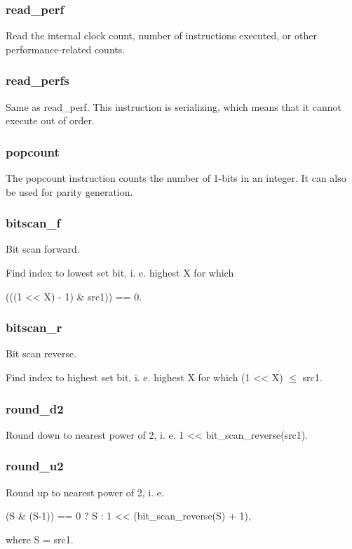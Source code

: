 \documentclass[forwardcom.tex]{subfiles}
\begin{document}
\subsubsection{read\_perf}
Read the internal clock count, number of instructions executed, or other performance-related counts.

\subsubsection{read\_perfs}
Same as read\_perf. This instruction is serializing, which means that it cannot execute out of order.

\subsubsection{popcount}
The popcount instruction counts the number of 1-bits in an integer. It can also be used for parity generation.

\subsubsection{bitscan\_f}
Bit scan forward. 
\vspace{2mm}

Find index to lowest set bit, i. e. highest X for which 

(((1 \textless\textless{} X) - 1) \& src1)) == 0.

\subsubsection{bitscan\_r}
Bit scan reverse. 

Find index to highest set bit, i. e. highest X for which (1 \textless\textless{} X) $\leq$ src1.

\subsubsection{round\_d2}
Round down to nearest power of 2, i. e. 1 \textless\textless{} bit\_scan\_reverse(src1).

\subsubsection{round\_u2}
Round up to nearest power of 2, i. e. 

(S \& (S-1)) == 0 ? S : 1 \textless\textless{}  (bit\_scan\_reverse(S) + 1),

where S = src1.
\end{document}
